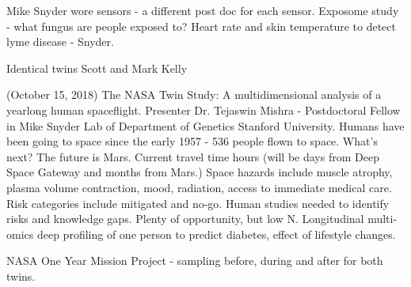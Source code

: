 \documentclass[a4paper, 11pt]{article}
\begin{document}
    
     Mike Snyder wore sensors - a different post doc for each sensor. Exposome study - what fungus are people exposed to? Heart rate and skin temperature to detect lyme disease - Snyder. 
     
    
     Identical twins Scott and Mark Kelly 
     
    (October 15, 2018) The NASA Twin Study: A multidimensional analysis of a yearlong human spaceflight. Presenter Dr. Tejaswin Mishra - Postdoctoral Fellow in Mike Snyder Lab of  Department of Genetics Stanford University. 
    Humans have been going to space since the early 1957 - 536 people flown to space. What's next?
    The future is Mars. Current travel time hours (will be days from Deep Space Gateway and months from Mars.) Space hazards include muscle atrophy, plasma volume contraction, mood, radiation, access to immediate medical care. Risk categories include mitigated and no-go. 
    Human studies needed to identify risks and knowledge gaps. Plenty of opportunity, but low N. Longitudinal multi-omics deep profiling of one person to predict diabetes, effect of lifestyle changes.
    
    NASA One Year Mission Project - sampling before, during and after for both twins. 
    
\end{document}
